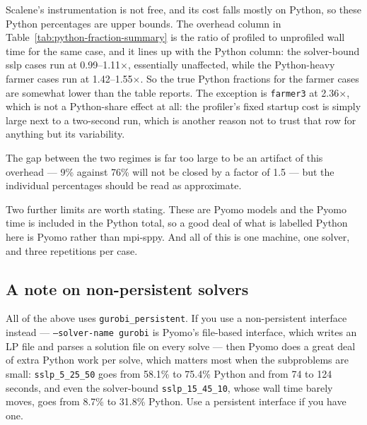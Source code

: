 \documentclass{article}
\begin{document}
Scalene's instrumentation is not free, and its cost falls mostly on
Python, so these Python percentages are upper bounds. The overhead
column in Table~\ref{tab:python-fraction-summary} is the ratio of
profiled to unprofiled wall time for the same case, and it lines up
with the Python column: the solver-bound sslp cases run at
0.99--1.11$\times$, essentially unaffected, while the Python-heavy
farmer cases run at 1.42--1.55$\times$. So the true Python fractions
for the farmer cases are somewhat lower than the table reports. The
exception is \texttt{farmer3} at 2.36$\times$, which is not a
Python-share effect at all: the profiler's fixed startup cost is simply
large next to a two-second run, which is another reason not to trust
that row for anything but its variability.

The gap between the two regimes is far too large to be an artifact of
this overhead --- 9\% against 76\% will not be closed by a factor of
1.5 --- but the individual percentages should be read as approximate.

Two further limits are worth stating. These are Pyomo models and the
Pyomo time is included in the Python total, so a good deal of what is
labelled Python here is Pyomo rather than mpi-sppy. And all of this is
one machine, one solver, and three repetitions per case.

\subsection{A note on non-persistent solvers}

All of the above uses \texttt{gurobi\_persistent}. If you use a
non-persistent interface instead --- \texttt{--solver-name gurobi} is
Pyomo's file-based interface, which writes an LP file and parses a
solution file on every solve --- then Pyomo does a great deal of extra
Python work per solve, which matters most when the subproblems are
small: \texttt{sslp\_5\_25\_50} goes from 58.1\% to 75.4\% Python and
from 74 to 124 seconds, and even the solver-bound
\texttt{sslp\_15\_45\_10}, whose wall time barely moves, goes from
8.7\% to 31.8\% Python. Use a persistent interface if you have one.
\end{document}
